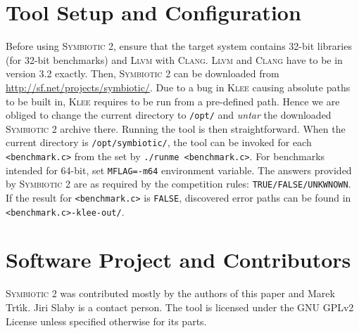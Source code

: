 \documentclass[10pt]{llncs}
\newcommand\tool{\textsc{Symbiotic}\xspace}
\newcommand\klee{\textsc{Klee}\xspace}
\begin{document}

\section{Tool Setup and Configuration}
Before using \tool 2, ensure that the target system contains 32-bit
libraries (for 32-bit benchmarks) and \textsc{Llvm} with \textsc{Clang}.
\textsc{Llvm} and \textsc{Clang} have to be in version 3.2 exactly.  Then,
\tool 2 can be downloaded from \url{http://sf.net/projects/symbiotic/}.
Due to a bug in \klee causing absolute paths to be built in, \klee requires to
be run from a pre-defined path. Hence we are obliged to change the current
directory to \texttt{/opt/} and \emph{untar} the downloaded \tool 2 archive
there.  Running the tool is then straightforward.  When the current directory
is \texttt{/opt/symbiotic/}, the tool can be invoked for each
\texttt{<benchmark.c>} from the set by \texttt{./runme <benchmark.c>}. For
benchmarks intended for 64-bit, set \texttt{MFLAG=-m64} environment variable.
The answers provided by \tool 2 are as required by the competition rules:
\texttt{TRUE/FALSE/UNKWNOWN}. If the result for \texttt{<benchmark.c>} is
\texttt{FALSE}, discovered error paths can be found in
\texttt{<benchmark.c>-klee-out/}.


\section{Software Project and Contributors}
\tool 2 was contributed mostly by the authors of this paper and Marek
Trt\'{\i}k. Jiri Slaby is a contact person. The tool is licensed under the GNU
GPLv2 License unless specified otherwise for its parts.





\end{document}
